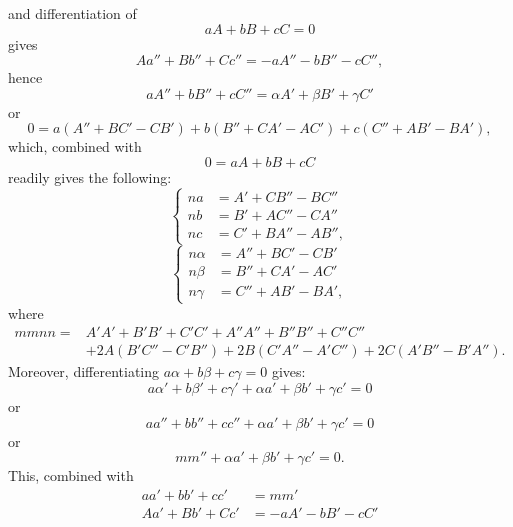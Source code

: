 %
\noindent and differentiation of
\[
aA+bB+cC=0
\]
gives
\[
Aa''+Bb''+Cc''=-aA''-bB''-cC'',
\]
hence
\[
aA''+bB''+cC''=\alpha A'+\beta B'+\gamma C'
\]
or
\[
0=a(A''+BC'-CB')+b(B''+CA'-AC')+c(C''+AB'-BA'),
\]
which, combined with
\[
0=aA+bB+cC
\]
readily gives the following:
\begin{equation}\tag*{[12]}
\left\{\begin{aligned}
na&=A'+CB''-BC''\\
nb&=B'+AC''-CA''\\
nc&=C'+BA''-AB'',
\end{aligned}\right.
\end{equation}
\begin{equation}\tag*{[13]}
\left\{\begin{aligned}
n\alpha&=A''+BC'-CB'\\
n\beta&=B''+CA'-AC'\\
n\gamma&=C''+AB'-BA',
\end{aligned}\right.
\end{equation}
where
{\small
\begin{equation}\tag*{[14]}
\begin{aligned}
mmnn={}&A'A'+B'B'+C'C'+A''A''+B''B''+C''C''\\
&+2A(B'C''-C'B'')+2B(C'A''-A'C'')+2C(A'B''-B'A'').
\end{aligned}
\end{equation}
}
\indent Moreover, differentiating $a\alpha+b\beta+c\gamma=0$ gives:
\[
a\alpha'+b\beta'+c\gamma'+\alpha a'+\beta b'+\gamma c'=0
\]
or
\[
aa''+bb''+cc''+\alpha a'+\beta b'+\gamma c'=0
\]
or
\[
mm''+\alpha a'+\beta b'+\gamma c'=0.
\]
This, combined with
\[
\begin{aligned}
aa'+bb'+cc'&=mm'\\
Aa'+Bb'+Cc'&=-aA'-bB'-cC'
\end{aligned}
\]
